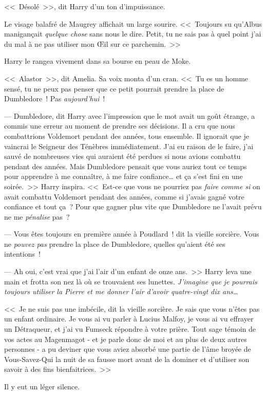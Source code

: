 <<~Désolé~>>, dit Harry d'un ton d'impuissance.

Le visage balafré de Maugrey affichait un large sourire. <<~Toujours su qu'Albus manigançait \emph{quelque chose} sans nous le dire. Petit, tu ne sais pas à quel point j'ai du mal à ne pas utiliser mon Œil sur ce parchemin.~>>

Harry le rangea vivement dans sa bourse en peau de Moke.

<<~Alastor~>>, dit Amelia. Sa voix monta d'un cran. <<~Tu es un homme sensé, tu ne peux pas penser que ce petit pourrait prendre la place de Dumbledore~! Pas \emph{aujourd'hui}~!

--- Dumbledore, dit Harry avec l'impression que le mot avait un goût étrange, a commis une erreur au moment de prendre ses décisions. Il a cru que nous combattrions Voldemort pendant des années, tous ensemble. Il ignorait que je vaincrai le Seigneur des Ténèbres immédiatement. J'ai eu raison de le faire, j'ai sauvé de nombreuses vies qui auraient été perdues si nous avions combattu pendant des années. Mais Dumbledore pensait que vous auriez tout ce temps pour apprendre à me connaître, à me faire confiance… et ça s'est fini en une soirée.~>> Harry inspira. <<~Est-ce que vous ne pourriez pas \emph{faire comme si} on avait combattu Voldemort pendant des années, comme si j'avais gagné votre confiance et tout ça~? Pour que gagner plus vite que Dumbledore ne l'avait prévu ne me \emph{pénalise} pas~?

--- Vous êtes toujours en première année à Poudlard~! dit la vieille sorcière. Vous ne \emph{pouvez pas} prendre la place de Dumbledore, quelles qu'aient été ses intentions~!

--- Ah oui, c'est vrai que j'ai l'air d'un enfant de onze ans.~>> Harry leva une main et frotta son nez là où se trouvaient ses lunettes. \emph{J'imagine que je pourrais toujours utiliser la Pierre et me donner l'air d'avoir quatre-vingt dix ans…}

<<~Je ne suis pas une imbécile, dit la vieille sorcière. Je sais que vous n'êtes pas un enfant ordinaire. Je vous ai vu parler à Lucius Malfoy, je vous ai vu effrayer un Détraqueur, et j'ai vu Fumseck répondre à votre prière. Tout sage témoin de vos actes au Magenmagot - et je parle donc de moi et au plus de deux autres personnes - a pu deviner que vous aviez absorbé une partie de l'âme broyée de Vous-Savez-Qui la nuit de sa fausse mort avant de la dominer et d'utiliser son savoir à des fins bienfaitrices.~>>

Il y eut un léger silence.

